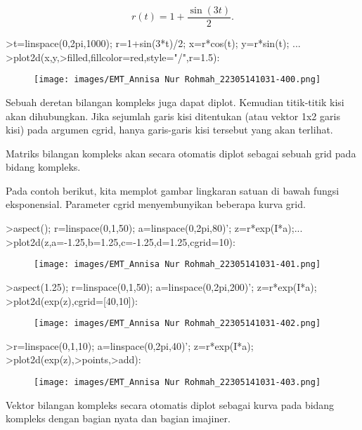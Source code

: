 \documentclass[a4paper,10pt]{article}
\begin{document}
\begin{eulernotebook}
\begin{eulercomment}
\end{eulercomment}
\begin{eulerformula}
\[
r(t) = 1 + \dfrac{\sin(3t)}{2}.
\]
\end{eulerformula}
\begin{eulerprompt}
>t=linspace(0,2pi,1000); r=1+sin(3*t)/2; x=r*cos(t); y=r*sin(t); ...
>plot2d(x,y,>filled,fillcolor=red,style="/",r=1.5):
\end{eulerprompt}
\begin{figure}[h]
    \centering
    \texttt{[image: images/EMT\_Annisa Nur Rohmah\_22305141031-400.png]}
\end{figure}
\begin{eulercomment}
Sebuah deretan bilangan kompleks juga dapat diplot. Kemudian
titik-titik kisi akan dihubungkan. Jika sejumlah garis kisi ditentukan
(atau vektor 1x2 garis kisi) pada argumen cgrid, hanya garis-garis
kisi tersebut yang akan terlihat.

Matriks bilangan kompleks akan secara otomatis diplot sebagai sebuah
grid pada bidang kompleks.

Pada contoh berikut, kita memplot gambar lingkaran satuan di bawah
fungsi eksponensial. Parameter cgrid menyembunyikan beberapa kurva
grid.
\end{eulercomment}
\begin{eulerprompt}
>aspect(); r=linspace(0,1,50); a=linspace(0,2pi,80)'; z=r*exp(I*a);...
>plot2d(z,a=-1.25,b=1.25,c=-1.25,d=1.25,cgrid=10):
\end{eulerprompt}
\begin{figure}[h]
    \centering
    \texttt{[image: images/EMT\_Annisa Nur Rohmah\_22305141031-401.png]}
\end{figure}
\begin{eulerprompt}
>aspect(1.25); r=linspace(0,1,50); a=linspace(0,2pi,200)'; z=r*exp(I*a);
>plot2d(exp(z),cgrid=[40,10]):
\end{eulerprompt}
\begin{figure}[h]
    \centering
    \texttt{[image: images/EMT\_Annisa Nur Rohmah\_22305141031-402.png]}
\end{figure}
\begin{eulerprompt}
>r=linspace(0,1,10); a=linspace(0,2pi,40)'; z=r*exp(I*a);
>plot2d(exp(z),>points,>add):
\end{eulerprompt}
\begin{figure}[h]
    \centering
    \texttt{[image: images/EMT\_Annisa Nur Rohmah\_22305141031-403.png]}
\end{figure}
\begin{eulercomment}
Vektor bilangan kompleks secara otomatis diplot sebagai kurva pada
bidang kompleks dengan bagian nyata dan bagian imajiner.


\end{eulercomment}
\end{eulernotebook}
\end{document}
